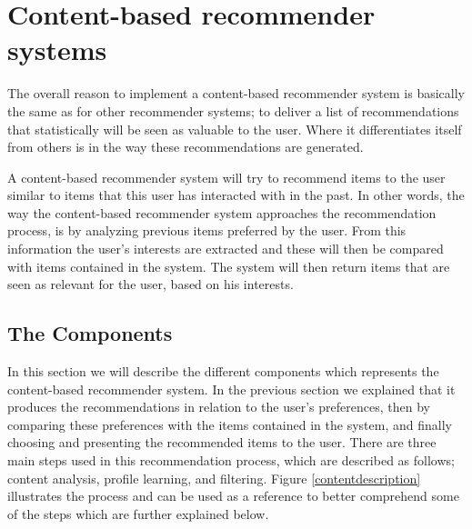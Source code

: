 \section{Content-based recommender systems}
\label{sec:content}
The overall reason to implement a content-based recommender system is basically the same as for other recommender systems; to deliver a list of recommendations that statistically will be seen as valuable to the user. Where it differentiates itself from others is in the way these recommendations are generated.\newline 

A content-based recommender system will try to recommend items to the user similar to items that this user has interacted with in the past. In other words, the way the content-based recommender system approaches the recommendation process, is by analyzing previous items preferred by the user. From this information the user's interests are extracted and these will then be compared with items contained in the system.\newline
The system will then return items that are seen as relevant for the user, based on his interests. 

\subsection{The Components}
In this section we will describe the different components which represents the content-based recommender system. In the previous section we explained that it produces the recommendations in relation to the user's preferences, then by comparing these preferences with the items contained in the system, and finally choosing and presenting the recommended items to the user. \newline
There are three main steps used in this recommendation process, which are described as follows; content analysis, profile learning, and filtering. Figure \ref{contentdescription} illustrates the process and can be used as a reference to better comprehend some of the steps which are further explained below.


